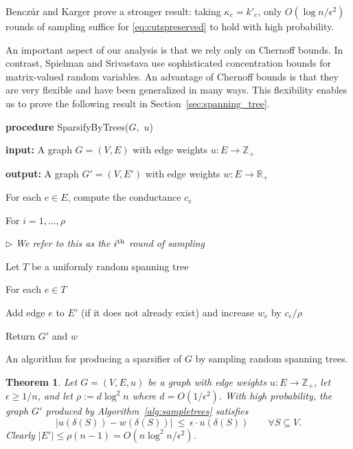\documentclass[11pt]{article}
\numberwithin{equation}{section}
\newenvironment{alg}{
    \begin{list}{}{
        \setlength{\itemsep}{2pt}
        \setlength{\parsep}{0pt}
        \setlength{\parskip}{0pt}
        \setlength{\topsep}{1pt}
    }
}
{
    \end{list}
}
\newtheorem{theorem}{Theorem}[section]
\renewcommand{\th}{\ifmmode{^{\textrm{th}}}\else{\textsuperscript{th}\ }\fi}
\newcommand{\bR}{\mathbb{R}}
\newcommand{\bZ}{\mathbb{Z}}
\newcommand{\eps}{\epsilon}
\newcommand{\AlgorithmName}[1]{\label{alg:#1}}
\newcommand{\Algorithm}[1]{Algorithm~\ref{alg:#1}}
\newcommand{\Section}[1]{Section~\ref{sec:#1}}
\newcommand{\TheoremName}[1]{\label{thm:#1}}
\begin{document}
Bencz\'ur and Karger \cite{BK} prove a stronger result:
taking $\kappa_e = k'_e$, only $O(\log n/\epsilon^2)$ rounds of sampling suffice
for \eqref{eq:cutspreserved} to hold with high probability.

\vspace{6pt}

An important aspect of our analysis is that we rely only on Chernoff bounds.
In contrast, Spielman and Srivastava \cite{SS} use sophisticated concentration bounds for
matrix-valued random variables.
An advantage of Chernoff bounds is that they are very flexible
and have been generalized in many ways.
This flexibility enables us to prove the following result in \Section{spanning_tree}.


\begin{algorithm}
\begin{alg}
\item	\textbf{procedure} SparsifyByTrees($G$,\, $u$)
\item	\textbf{input:} A graph $G=(V,E)$
        with edge weights $u : E \rightarrow \bZ_+$
\item	\textbf{output:} A graph $G' = (V,E')$ with edge weights $w : E \rightarrow \bR_+$
\item   For each $e \in E$, compute the conductance $c_e$
\item   For $i=1,\ldots,\rho$
    \begin{alg}
    \item   $\rhd$ \textit{We refer to this as the $i\th$ round of sampling}
    \item   Let $T$ be a uniformly random spanning tree
    \item   For each $e \in T$
        \begin{alg}
        \item   Add edge $e$ to $E'$
                (if it does not already exist) and increase $w_e$ by $c_e / \rho$
        \end{alg}
    \end{alg}
\item   Return $G'$ and $w$
\end{alg}
\caption{An algorithm for producing a sparsifier of $G$ by sampling random spanning trees.}
\AlgorithmName{sampletrees}
\end{algorithm}


\begin{theorem}
\TheoremName{sample_with_trees}
Let $G=(V,E,u)$ be a graph with edge weights $u : E \rightarrow \bZ_+$,
let $\eps \geq 1/n$, and let $\rho := d \log^2 n$ where $d = O(1/\eps^2)$.
With high probability, the graph $G'$ produced by \Algorithm{sampletrees} satisfies
$$
    |u(\delta(S))-w(\delta(S))| ~\le~ \epsilon \cdot u(\delta(S)) \qquad\forall S\subseteq V.
$$
Clearly $|E'| \leq \rho(n-1) = O( n \log^2 n / \epsilon^2 )$.
\end{theorem}
\end{document}
